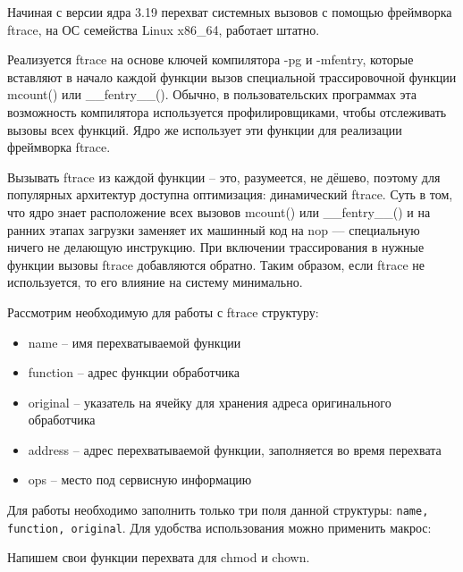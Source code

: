 \par Начиная с версии ядра 3.19 перехват системных вызовов с помощью фреймворка ftrace, на ОС семейства Linux x86\_64, работает штатно.

\par Реализуется ftrace на основе ключей компилятора -pg и -mfentry, которые вставляют в начало каждой функции вызов специальной трассировочной функции mcount() или \_\_fentry\_\_(). Обычно, в пользовательских программах эта возможность компилятора используется профилировщиками, чтобы отслеживать вызовы всех функций. Ядро же использует эти функции для реализации фреймворка ftrace.

\par Вызывать ftrace из каждой функции -- это, разумеется, не дёшево, поэтому для популярных архитектур доступна оптимизация: динамический ftrace. Суть в том, что ядро знает расположение всех вызовов mcount() или \_\_fentry\_\_() и на ранних этапах загрузки заменяет их машинный код на nop — специальную ничего не делающую инструкцию. При включении трассирования в нужные функции вызовы ftrace добавляются обратно. Таким образом, если ftrace не используется, то его влияние на систему минимально.

\par Рассмотрим необходимую для работы с ftrace структуру:



\begin{itemize}
	\item name -- имя перехватываемой функции
	\item function -- адрес функции обработчика 
	\item original -- указатель на ячейку для хранения адреса оригинального обработчика
	\item address -- адрес перехватываемой функции, заполняется во время перехвата
	\item ops -- место под сервисную информацию
\end{itemize}

\par Для работы необходимо заполнить только три поля данной структуры: \lstinline|name, function, original|. Для удобства использования можно применить макрос:



\par Напишем свои функции перехвата для chmod и chown.

